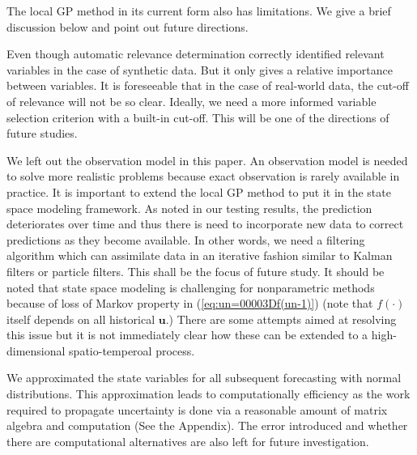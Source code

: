 \documentclass[smallextended,natbib]{svjour3}       %
\begin{document}
The local GP method in its current form also has limitations. We give a brief discussion below and point out future directions.         

Even though automatic relevance determination correctly identified relevant variables in the case of synthetic data. But it only gives a relative importance between variables. It is foreseeable that in the case of real-world data, the cut-off of relevance will not be so clear. Ideally, we need a more informed variable selection criterion with a built-in cut-off. This will be one of the directions of future studies. 

We left out the observation model in this paper. An observation model is needed to solve more realistic problems because exact observation is rarely available in practice. It is important to extend the local GP method to put it in the state space modeling framework. As noted in our testing results, the prediction deteriorates over time and thus there is need to incorporate new data to correct predictions as they become available. In other words, we need a filtering algorithm which can assimilate data in an iterative fashion similar to Kalman filters or particle filters. This shall be the focus of future study. It should be noted that state space modeling is challenging for nonparametric methods because of loss of Markov property in (\ref{eq:un=00003Df(un-1)}) (note that $f(\cdot)$ itself depends on all historical $\mathbf{u}$.) There are some attempts aimed at resolving this issue \citep{frigola2013bayesian,Ghosh2014} but it is not immediately clear how these can be extended to a high-dimensional spatio-temperoal process. 

We approximated the state variables for all subsequent forecasting with normal distributions. This approximation leads to computationally efficiency as the work required to propagate uncertainty is done via a reasonable amount of matrix algebra and computation (See the Appendix). The error introduced and whether there are computational alternatives are also left for future investigation.
\end{document}
